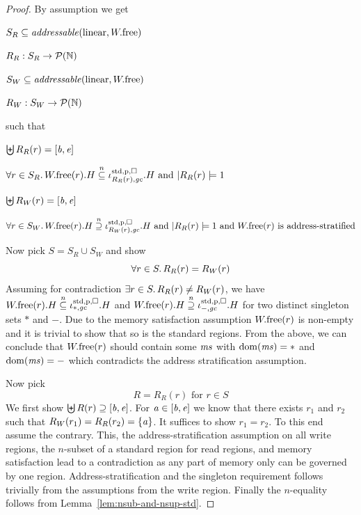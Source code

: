 \documentclass[a4paper]{article}
\begin{document}
\begin{proof}
  By assumption we get
  \begin{enumproof}
    \item $S_R \subseteq \addressable{\linear,\pwfree}$
    \item $R_R : S_R \rightarrow \mathcal{P}(\mathbb{N})$
    \item $S_W \subseteq \addressable{\linear,\pwfree}$
    \item $R_W : S_W \rightarrow \mathcal{P}(\mathbb{N})$
  \end{enumproof}
  such that
  \begin{enumproof}[resume]
    \item $\biguplus R_R(r) = [\mathit{b},\mathit{e}]$
    \item $\forall r \in S_R \ldotp W.\mathrm{free}(r).H \overset{n}{\subseteq}
      \iota^{\mathrm{std},\mathrm{p},\square}_{R_R(r),\mathit{gc}}.H \text{ and } |R_R(r)|=1$
    \item $\biguplus R_W(r) = [\mathit{b},\mathit{e}]$
    \item $\forall r \in S_W \ldotp W.\mathrm{free}(r).H \overset{n}{\supseteq}
      \iota^{\mathrm{std},\mathrm{p},\square}_{R_W(r),\mathit{gc}}.H \text{ and } |R_R(r)|=1 \text{ and } W.\mathrm{free}(r)
      \text{ is address-stratified}$
  \end{enumproof}
  Now pick $S = S_R \cup S_W$ and show
  \[
    \forall r \in S \ldotp R_R(r) = R_W(r)
  \]
  Assuming for contradiction $\exists r \in S \ldotp R_R(r) \neq R_W(r)$, we have $W.\mathrm{free}(r).H \overset{n}{\subseteq} \iota^{\mathrm{std},\mathrm{p},\square}_{*,\mathit{gc}}.H$ and $W.\mathrm{free}(r).H \overset{n}{\supseteq} \iota^{\mathrm{std},\mathrm{p},\square}_{-,\mathit{gc}}.H$ for two distinct singleton sets $*$ and $-$.
  Due to the memory satisfaction assumption $W.\mathrm{free}(r)$ is non-empty and it is trivial to show that so is the standard regions.
  From the above, we can conclude that $W.\mathrm{free}(r)$ should contain some $\mathit{ms}$
  with $\mathrm{dom}(\mathit{ms}) = *$ and $\mathrm{dom}(\mathit{ms}) = -$ which contradicts the address
  stratification assumption.

  Now pick
  \[
    R = R_R(r) \text{ for $r \in S$}
  \]
  We first show $\biguplus R(r) \supseteq [\mathit{b},\mathit{e}]$.
  For $\mathit{a} \in [\mathit{b},\mathit{e}]$ we know that there exists $r_1$ and $r_2$ such that $R_W(r_1) = R_R(r_2) = \{\mathit{a}\}$.
  It suffices to show $r_1 = r_2$.
  To this end assume the contrary.
  This, the address-stratification assumption on all write regions, the $n$-subset of a standard region for read regions, and memory satisfaction lead to a contradiction as any part of memory only can be governed by one region.
  Address-stratification and the singleton requirement follows trivially from
  the assumptions from the write region. Finally the $n$-equality follows from Lemma~\ref{lem:nsub-and-nsup-std}.
\end{proof}
\end{document}
